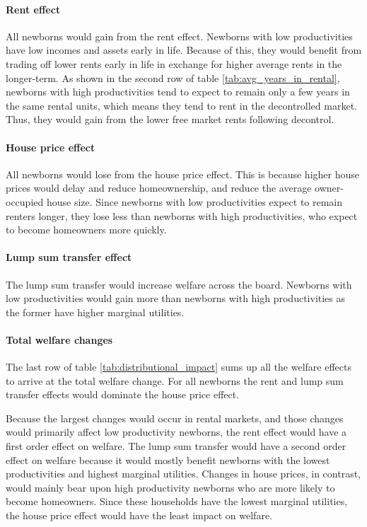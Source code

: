 \documentclass[parskip=full]{article}
\begin{document}
\paragraph{Rent effect} All newborns would gain from the rent effect. Newborns with low productivities have low incomes and assets early in life. Because of this, they would benefit from trading off lower rents early in life in exchange for higher average rents in the longer-term. As shown in the second row of table \ref{tab:avg_years_in_rental}, newborns with high productivities tend to expect to remain only a few years in the same rental units, which means they tend to rent in the decontrolled market. Thus, they would gain from the lower free market rents following decontrol.

\paragraph{House price effect} All newborns would lose from the house price effect. This is because higher house prices would delay and reduce homeownership, and reduce the average owner-occupied house size. Since newborns with low productivities expect to remain renters longer, they lose less than newborns with high productivities, who expect to become homeowners more quickly. 

\paragraph{Lump sum transfer effect} The lump sum transfer would increase welfare across the board. Newborns with low productivities would gain more than newborns with high productivities as the former have higher marginal utilities.

\paragraph{Total welfare changes} The last row of table \ref{tab:distributional_impact} sums up all the welfare effects to arrive at the total welfare change. For all newborns the rent and lump sum transfer effects would dominate the house price effect.

Because the largest changes would occur in rental markets, and those changes would primarily affect low productivity newborns, the rent effect would have a first order effect on welfare. The lump sum transfer would have a second order effect on welfare because it would mostly benefit newborns with the lowest productivities and highest marginal utilities. Changes in house prices, in contrast, would mainly bear upon high productivity newborns who are more likely to become homeowners. Since these households have the lowest marginal utilities, the house price effect would have the least impact on welfare. 
\end{document}
